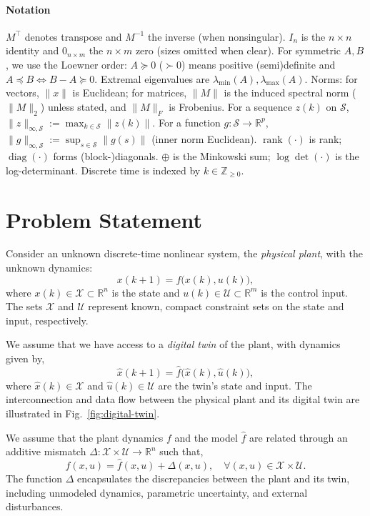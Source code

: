 \documentclass[letterpaper, 10 pt, conference]{ieeeconf}
\DeclareMathOperator{\rank}{rank}
\DeclareMathOperator{\diag}{diag}
\begin{document}
\paragraph*{Notation}
$M^\top$ denotes transpose and $M^{-1}$ the inverse (when nonsingular). $I_n$ is the $n\times n$ identity and $0_{n\times m}$ the $n\times m$ zero (sizes omitted when clear). For symmetric $A,B$, we use the Loewner order: $A\succeq0$ ($\succ0$) means positive (semi)definite and $A\preceq B\iff B-A\succeq0$. Extremal eigenvalues are $\lambda_{\min}(A),\lambda_{\max}(A)$. Norms: for vectors, $\|x\|$ is Euclidean; for matrices, $\|M\|$ is the induced spectral norm ($\|M\|_2$) unless stated, and $\|M\|_F$ is Frobenius. For a sequence $z(k)$ on $\mathcal S$, $\|z\|_{\infty,\mathcal S}:=\max_{k\in\mathcal S}\|z(k)\|$. For a function $g:\mathcal S\to\mathbb R^p$, $\|g\|_{\infty,\mathcal S}:=\sup_{s\in\mathcal S}\|g(s)\|$ (inner norm Euclidean). $\rank(\cdot)$ is rank; $\diag(\cdot)$ forms (block-)diagonals. $\oplus$ is the Minkowski sum; $\log\det(\cdot)$ is the log-determinant. Discrete time is indexed by $k\in\mathbb Z_{\ge0}$.

\section{Problem Statement}
\label{sec:problem_statement}

Consider an unknown discrete-time nonlinear system, the \emph{physical plant}, with the unknown dynamics:
\begin{equation}\label{eq:phys_dt}
    x(k+1) = f\big(x(k), u(k)\big),
\end{equation}
where \(x(k) \in \mathcal{X} \subset \mathbb{R}^n\) is the state and \(u(k) \in \mathcal{U} \subset \mathbb{R}^m\) is the control input. The sets \(\mathcal{X}\) and \(\mathcal{U}\) represent known, compact constraint sets on the state and input, respectively.

We assume that we have access to a \emph{digital twin} of the plant, with dynamics given by,
\begin{equation}\label{eq:twin_dt}
\hat{x}({k+1})= \hat{f}\big(\hat{x}(k), \hat{u}(k)\big),
\end{equation}
where \(\hat{x}(k) \in \mathcal{X}\) and \(\hat{u}(k) \in \mathcal{U}\) are the twin's state and input. The interconnection and data flow between the physical plant and its digital twin are illustrated in Fig.~\ref{fig:digital-twin}.

We assume that the plant dynamics \(f\) and the model \(\hat{f}\) are related through an additive mismatch \(\Delta: \mathcal{X} \times \mathcal{U} \to \mathbb{R}^n\) such that,
\begin{equation}\label{eq:mismatch}
f(x, u) = \hat{f}(x, u) + \Delta(x, u), \quad \forall (x, u) \in \mathcal{X} \times \mathcal{U}.
\end{equation}
The function \(\Delta\) encapsulates the discrepancies between the plant and its twin, including unmodeled dynamics, parametric uncertainty, and external disturbances.
\end{document}
